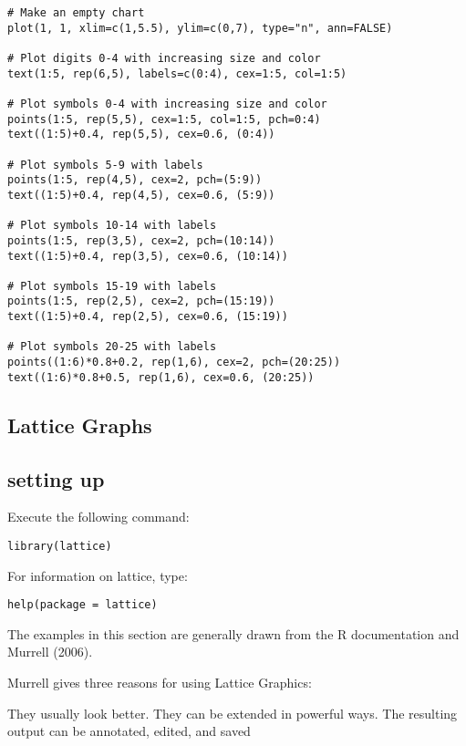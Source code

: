 \documentclass[a4paper,12pt]{article}
\begin{document}
\begin{itemize}
\begin{myindentpar}{1cm}
\footnotesize \begin{verbatim}
# Make an empty chart
plot(1, 1, xlim=c(1,5.5), ylim=c(0,7), type="n", ann=FALSE)

# Plot digits 0-4 with increasing size and color
text(1:5, rep(6,5), labels=c(0:4), cex=1:5, col=1:5)

# Plot symbols 0-4 with increasing size and color
points(1:5, rep(5,5), cex=1:5, col=1:5, pch=0:4)
text((1:5)+0.4, rep(5,5), cex=0.6, (0:4))

# Plot symbols 5-9 with labels
points(1:5, rep(4,5), cex=2, pch=(5:9))
text((1:5)+0.4, rep(4,5), cex=0.6, (5:9))

# Plot symbols 10-14 with labels
points(1:5, rep(3,5), cex=2, pch=(10:14))
text((1:5)+0.4, rep(3,5), cex=0.6, (10:14))

# Plot symbols 15-19 with labels
points(1:5, rep(2,5), cex=2, pch=(15:19))
text((1:5)+0.4, rep(2,5), cex=0.6, (15:19))

# Plot symbols 20-25 with labels
points((1:6)*0.8+0.2, rep(1,6), cex=2, pch=(20:25))
text((1:6)*0.8+0.5, rep(1,6), cex=0.6, (20:25))
\end{verbatim}\normalsize
\end{myindentpar}

\subsection{Lattice Graphs}
\subsection{setting up}
Execute the following command:
\begin{myindentpar}{1cm}
\begin{verbatim}
library(lattice)
\end{verbatim}
\end{myindentpar}
For information on lattice, type:
\begin{myindentpar}{1cm}
\begin{verbatim}
help(package = lattice)
\end{verbatim}
\end{myindentpar}
The examples in this section are generally drawn from the R documentation and Murrell (2006).

Murrell gives three reasons for using Lattice Graphics:

They usually look better.
They can be extended in powerful ways.
The resulting output can be annotated, edited, and saved


\end{itemize}
\end{document}
